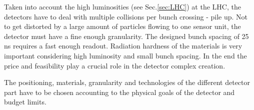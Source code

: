 Taken into account the high luminosities (see Sec.\ref{sec:LHC}) at the LHC,
the detectors have to deal with multiple collisions per bunch crossing - pile up. Not to get distorted by a large amount of particles 
flowing to one sensor unit, the detector must have a fine enough granularity. The designed bunch spacing of 25 ns 
requires a fast enough readout. Radiation hardness of the materials is very important considering high luminosity and small
bunch spacing. In the end the price and feasibility play a crucial role in the detector complex creation.

The positioning, materials, granularity and technologies of the different detector part have to be chosen accounting to the physical goals of the
detector and budget limits.

